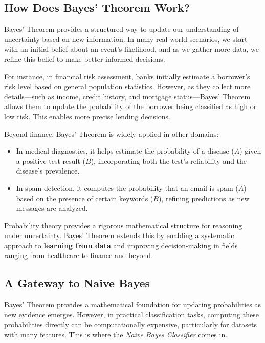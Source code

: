 \documentclass[
]{book}
\providecommand{\tightlist}{%
  \setlength{\itemsep}{0pt}\setlength{\parskip}{0pt}}
\theoremstyle{definition}
\theoremstyle{definition}
\theoremstyle{definition}
\theoremstyle{definition}
\theoremstyle{remark}
\begin{document}
\subsection*{How Does Bayes' Theorem Work?}\label{how-does-bayes-theorem-work}

Bayes' Theorem provides a structured way to update our understanding of uncertainty based on new information. In many real-world scenarios, we start with an initial belief about an event's likelihood, and as we gather more data, we refine this belief to make better-informed decisions.

For instance, in financial risk assessment, banks initially estimate a borrower's risk level based on general population statistics. However, as they collect more details---such as income, credit history, and mortgage status---Bayes' Theorem allows them to update the probability of the borrower being classified as high or low risk. This enables more precise lending decisions.

Beyond finance, Bayes' Theorem is widely applied in other domains:

\begin{itemize}
\tightlist
\item
  In medical diagnostics, it helps estimate the probability of a disease (\(A\)) given a positive test result (\(B\)), incorporating both the test's reliability and the disease's prevalence.\\
\item
  In spam detection, it computes the probability that an email is spam (\(A\)) based on the presence of certain keywords (\(B\)), refining predictions as new messages are analyzed.
\end{itemize}

Probability theory provides a rigorous mathematical structure for reasoning under uncertainty. Bayes' Theorem extends this by enabling a systematic approach to \textbf{learning from data} and improving decision-making in fields ranging from healthcare to finance and beyond.

\subsection*{A Gateway to Naive Bayes}\label{a-gateway-to-naive-bayes}

Bayes' Theorem provides a mathematical foundation for updating probabilities as new evidence emerges. However, in practical classification tasks, computing these probabilities directly can be computationally expensive, particularly for datasets with many features. This is where the \emph{Naive Bayes Classifier} comes in.
\end{document}
